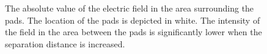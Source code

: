 \begin{figure}
\begin{tabular}{c c}
 	\end{tabular}	
 	\centering	
 	\caption{The absolute value of the electric field in the area surrounding the pads. The location of the pads is depicted in white. The intensity of the field in the area between the pads is significantly lower when the separation distance is increased.  }
 	\label{fig:PadSeparationFields}
 \end{figure}
 
% 
% 
  




    